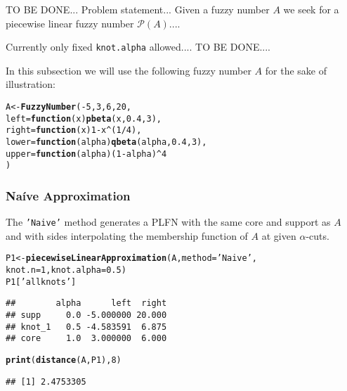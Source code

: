 \documentclass[11pt]{article}\usepackage{graphicx, color}
\makeatletter
\newcommand{\hlfunctioncall}[1]{\textcolor[rgb]{0.501960784313725,0,0.329411764705882}{\textbf{#1}}}%
\newcommand{\hlstring}[1]{\textcolor[rgb]{0.6,0.6,1}{#1}}%
\newenvironment{kframe}{%
 \def\at@end@of@kframe{}%
 \ifinner\ifhmode%
  \def\at@end@of@kframe{\end{minipage}}%
  \begin{minipage}{\columnwidth}%
 \fi\fi%
 \def\FrameCommand##1{\hskip\@totalleftmargin \hskip-\fboxsep
 \colorbox{shadecolor}{##1}\hskip-\fboxsep
     \hskip-\linewidth \hskip-\@totalleftmargin \hskip\columnwidth}%
 \MakeFramed {\advance\hsize-\width
   \@totalleftmargin\z@ \linewidth\hsize
   \@setminipage}}%
 {\par\unskip\endMakeFramed%
 \at@end@of@kframe}
\newenvironment{knitrout}{}{} %
\makeatother
\begin{document}
TO BE DONE... Problem statement... Given a fuzzy number $A$ we seek for a piecewise linear
fuzzy number $\mathcal{P}(A)$....

Currently only fixed \texttt{knot.alpha} allowed.... TO BE DONE....

In this subsection we will use the following fuzzy number $A$
for the sake of illustration:

\begin{knitrout}\small
{}\color{fgcolor}\begin{kframe}
\begin{alltt}
A <- \hlfunctioncall{FuzzyNumber}(-5, 3, 6, 20,
   left=\hlfunctioncall{function}(x) \hlfunctioncall{pbeta}(x,0.4,3),
   right=\hlfunctioncall{function}(x) 1-x^(1/4),
   lower=\hlfunctioncall{function}(alpha) \hlfunctioncall{qbeta}(alpha,0.4,3),
   upper=\hlfunctioncall{function}(alpha) (1-alpha)^4
)
\end{alltt}
\end{kframe}
\end{knitrout}



\subsubsection{Na\'{i}ve Approximation}

The \texttt{'Naive'} method generates a PLFN with the same
core and support as $A$ and with sides interpolating the membership function
of $A$ at given $\alpha$-cuts.

\begin{knitrout}\small
{}\color{fgcolor}\begin{kframe}
\begin{alltt}
P1 <- \hlfunctioncall{piecewiseLinearApproximation}(A, method=\hlstring{'Naive'},
         knot.n=1, knot.alpha=0.5)
P1[\hlstring{'allknots'}]
\end{alltt}
\begin{verbatim}
##        alpha      left  right
## supp     0.0 -5.000000 20.000
## knot_1   0.5 -4.583591  6.875
## core     1.0  3.000000  6.000
\end{verbatim}
\begin{alltt}
\hlfunctioncall{print}(\hlfunctioncall{distance}(A, P1), 8)
\end{alltt}
\begin{verbatim}
## [1] 2.4753305
\end{verbatim}
\end{kframe}
\end{knitrout}
\end{document}
